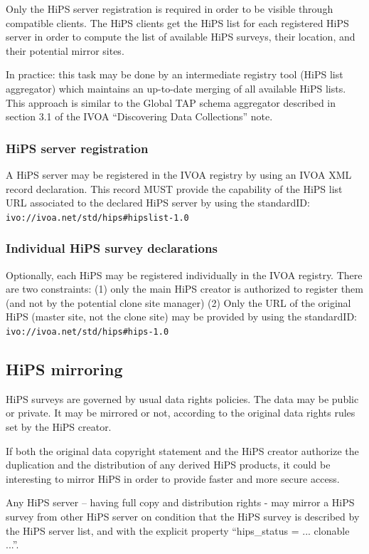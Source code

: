 \documentclass[11pt,a4paper]{ivoa}
\begin{document}
Only the HiPS server registration is required in order to be visible through compatible clients. The HiPS clients get the HiPS list for each registered HiPS server in order to compute the list of available HiPS surveys, their location, and their potential mirror sites.

In practice: this task may be done by an intermediate registry tool (HiPS list aggregator) which maintains an up-to-date merging of all available HiPS lists. This approach is similar to the Global TAP schema aggregator described in section 3.1 of the IVOA ``Discovering Data Collections'' note.

\subsubsection{HiPS server registration}

A HiPS server may be registered in the IVOA registry by using an IVOA XML record declaration. This record MUST provide the capability of the HiPS list URL associated to the declared HiPS server by using the standardID: \texttt{ivo://ivoa.net/std/hips\#hipslist-1.0}

\subsubsection{Individual HiPS survey declarations}

Optionally, each HiPS may be registered individually in the IVOA registry. There are two constraints: (1) only the main HiPS creator is authorized to register them (and not by the potential clone site manager) (2) Only the URL of the original HiPS (master site, not the clone site) may be provided by using the standardID: \texttt{ivo://ivoa.net/std/hips\#hips-1.0}

\subsection{HiPS mirroring}

HiPS surveys are governed by usual data rights policies. The data may be public or private. It may be mirrored or not, according to the original data rights rules set by the HiPS creator.

If both the original data copyright statement and the HiPS creator authorize the duplication and the distribution of any derived HiPS products, it could be interesting to mirror HiPS in order to provide faster and more secure access.

Any HiPS server -- having full copy and distribution rights - may mirror a HiPS survey from other HiPS server on condition that the HiPS survey is described by the HiPS server list, and with the explicit property ``hips\_status = ... clonable ...''.
\end{document}
